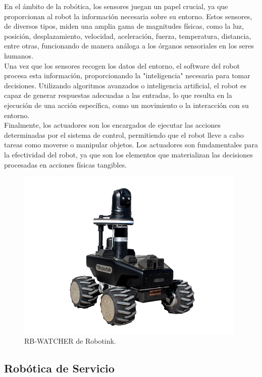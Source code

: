 En el ámbito de la robótica, los sensores juegan un papel crucial, ya que proporcionan al robot la información necesaria sobre su entorno. Estos sensores, de diversos tipos, miden una amplia gama de magnitudes físicas, como la luz, posición, desplazamiento, velocidad, aceleración, fuerza, temperatura, distancia, entre otras, funcionando de manera análoga a los órganos sensoriales en los seres humanos. \\

Una vez que los sensores recogen los datos del entorno, el software del robot procesa esta información, proporcionando la "inteligencia" necesaria para tomar decisiones. Utilizando algoritmos avanzados o inteligencia artificial, el robot es capaz de generar respuestas adecuadas a las entradas, lo que resulta en la ejecución de una acción específica, como un movimiento o la interacción con su entorno. \\

Finalmente, los actuadores son los encargados de ejecutar las acciones determinadas por el sistema de control, permitiendo que el robot lleve a cabo tareas como moverse o manipular objetos. Los actuadores son fundamentales para la efectividad del robot, ya que son los elementos que materializan las decisiones procesadas en acciones físicas tangibles. 

\begin{figure} [h!]
  \begin{center}
    \includegraphics[width=11cm]{figs/Robot_intro}
  \end{center}
  \caption{RB-WATCHER de Robotink.}
  \label{fig:Robot_intro}
\end{figure}

\subsection{Robótica de Servicio}
\label{sec:subseccion_1}

